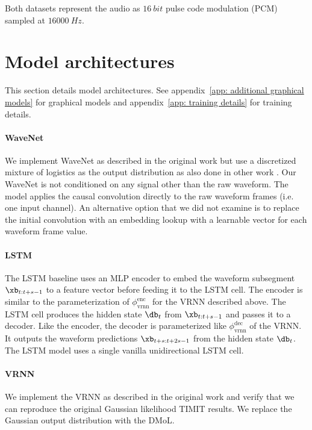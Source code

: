 {Both datasets represent the audio as $\SI{16}{bit}$ pulse code modulation (PCM) sampled at $\SI{16000}{Hz}$.


\section{Model architectures}\label{app: model architectures}
This section details model architectures. See appendix~\cref{app: additional graphical models} for graphical models and appendix~\cref{app: training details} for training details. 

\paragraph{WaveNet}
We implement WaveNet as described in the original work \cite{oord_wavenet_2016} but use a discretized mixture of logistics as the output distribution as also done in other work \cite{oord_parallel_2018}. Our WaveNet is not conditioned on any signal other than the raw waveform. The model applies the causal convolution directly to the raw waveform frames (i.e. one input channel). An alternative option that we did not examine is to replace the initial convolution with an embedding lookup with a learnable vector for each waveform frame value.

\paragraph{LSTM}
The LSTM baseline uses an MLP encoder to embed the waveform subsegment $\xb_{t:t+s-1}$ to a feature vector before feeding it to the LSTM cell. The encoder is similar to the parameterization of $\phi_\text{vrnn}^\text{enc}$ for the VRNN described above. The LSTM cell produces the hidden state $\db_t$ from $\xb_{t:t+s-1}$ and passes it to a decoder. Like the encoder, the decoder is parameterized like $\phi_\text{vrnn}^\text{dec}$ of the VRNN. It outputs the waveform predictions $\xb_{t+s:t+2s-1}$ from the hidden state $\db_t$. The LSTM model uses a single vanilla unidirectional LSTM cell. 

\paragraph{VRNN}
We implement the VRNN as described in the original work \cite{chung_recurrent_2015} and verify that we can reproduce the original Gaussian likelihood TIMIT results. We replace the Gaussian output distribution with the DMoL. 

}

